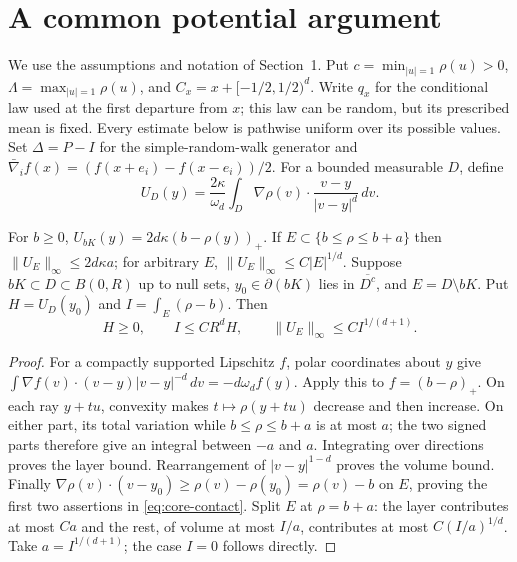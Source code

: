 \section{A common potential argument}

We use the assumptions and notation of Section~1. Put
$c=\min_{|u|=1}\rho(u)>0$, $\Lambda=\max_{|u|=1}\rho(u)$,
and $C_x=x+[-1/2,1/2)^d$. Write $q_x$ for the conditional law
used at the first departure from $x$; this law can be random,
but its prescribed mean is fixed. Every estimate below is pathwise
uniform over its possible values. Set $\Delta=P-I$ for the
simple-random-walk generator and
$\bar\nabla_i f(x)=(f(x+e_i)-f(x-e_i))/2$.
For a bounded measurable $D$, define
\begin{equation}\label{eq:core-potential}
 U_D(y)=\frac{2\kappa}{\omega_d}
 \int_D\nabla\rho(v)\cdot\frac{v-y}{|v-y|^d}\,dv.
\end{equation}

\begin{lemma}\label{lem:core-geometry}
For $b\geq0$,
$U_{bK}(y)=2d\kappa(b-\rho(y))_+$.
If $E\subset\{b\leq\rho\leq b+a\}$ then
$\|U_E\|_\infty\leq2d\kappa a$; for arbitrary $E$,
$\|U_E\|_\infty\leq C|E|^{1/d}$.
Suppose $bK\subset D\subset B(0,R)$ up to null sets, $y_0\in\partial(bK)$ lies in
$\overline{D^c}$, and $E=D\setminus bK$. Put
$H=U_D(y_0)$ and $I=\int_E(\rho-b)$.
Then
\begin{equation}\label{eq:core-contact}
 H\geq0,\qquad I\leq CR^d H,\qquad
 \|U_E\|_\infty\leq C I^{1/(d+1)}.
\end{equation}
\end{lemma}
\begin{proof}
For a compactly supported Lipschitz $f$, polar coordinates about $y$ give
$\int\nabla f(v)\cdot(v-y)|v-y|^{-d}\,dv=-d\omega_df(y)$.
Apply this to $f=(b-\rho)_+$. On each ray $y+tu$, convexity makes
$t\mapsto\rho(y+tu)$ decrease and then increase. On either part, its total
variation while $b\leq\rho\leq b+a$ is at most $a$; the two signed parts
therefore give an integral between $-a$ and $a$. Integrating over directions
proves the layer bound. Rearrangement of $|v-y|^{1-d}$ proves the volume
bound. Finally
$\nabla\rho(v)\cdot(v-y_0)\geq\rho(v)-\rho(y_0)=\rho(v)-b$
on $E$, proving the first two assertions in \eqref{eq:core-contact}.
Split $E$ at $\rho=b+a$: the layer contributes at most $Ca$ and the rest,
of volume at most $I/a$, contributes at most $C(I/a)^{1/d}$.
Take $a=I^{1/(d+1)}$; the case $I=0$ follows directly.
\end{proof}

